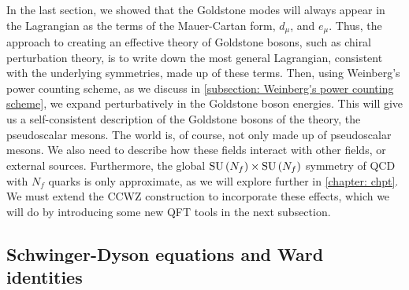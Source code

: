 In the last section, we showed that the Goldstone modes will always appear in the Lagrangian as the terms of the Mauer-Cartan form, $d_\mu$, and $e_\mu$.
Thus, the approach to creating an effective theory of Goldstone bosons, such as chiral perturbation theory, is to write down the most general Lagrangian, consistent with the underlying symmetries, made up of these terms.
Then, using Weinberg's power counting scheme, as we discuss in \autoref{subsection: Weinberg's power counting scheme}, we expand perturbatively in the Goldstone boson energies.
This will give us a self-consistent description of the Goldstone bosons of the theory, the pseudoscalar mesons.
The world is, of course, not only made up of pseudoscalar mesons.
We also need to describe how these fields interact with other fields, or external sources.
Furthermore, the global $\text{SU}\left(N_f\right)\times\text{SU}\left(N_f\right)$ symmetry of QCD with $N_f$ quarks is only approximate, as we will explore further in \autoref{chapter: chpt}.
We must extend the CCWZ construction to incorporate these effects, which we will do by introducing some new QFT tools in the next subsection.



\subsection{Schwinger-Dyson equations and Ward identities}
\label{subsection: ward identities}


